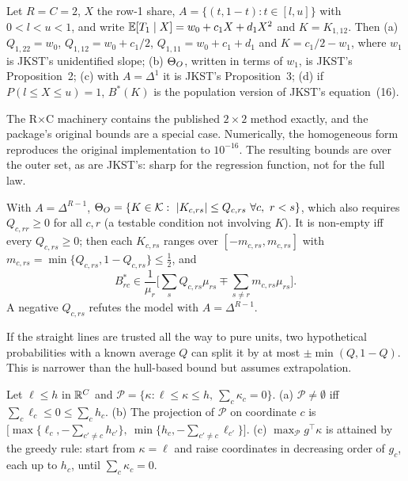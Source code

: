 \begin{proposition}\label{prop:jkst}
Let $R=C=2$, $X$ the row-1 share, $A=\{(t,1-t):t\in[l,u]\}$ with $0<l<u<1$, and
write $\mathbb E[T_1\mid X]=w_0+c_1X+d_1X^2$ and $K=K_{1,12}$. Then (a)
$Q_{1,22}=w_0$, $Q_{1,12}=w_0+c_1/2$, $Q_{1,11}=w_0+c_1+d_1$ and $K=c_1/2-w_1$,
where $w_1$ is JKST's unidentified slope; (b) $\Theta_O$, written in terms of $w_1$, is
JKST's Proposition~2; (c) with $A=\Delta^1$ it is JKST's Proposition~3; (d) if
$P(l\le X\le u)=1$, $B^*(K)$ is the population version of JKST's equation~(16).
\end{proposition}
\begin{reading}
The R$\times$C machinery contains the published $2\times2$ method exactly, and
the package's original bounds are a special case. Numerically, the homogeneous
form reproduces the original implementation to $10^{-16}$. The resulting bounds
are over the outer set, as are JKST's: sharp for the regression function, not for
the full law.
\end{reading}

\begin{proposition}\label{prop:simplex}
With $A=\Delta^{R-1}$, $\ThO=\{K\in\Kspace:\ |K_{c,rs}|\le Q_{c,rs}\ \forall c,\ r<s\}$,
which also requires $Q_{c,rr}\ge0$ for all $c,r$ (a testable condition not involving $K$).
It is non-empty iff every $Q_{c,rs}\ge0$; then each $K_{c,rs}$ ranges over
$[-m_{c,rs},m_{c,rs}]$ with $m_{c,rs}=\min\{Q_{c,rs},1-Q_{c,rs}\}\le\tfrac12$, and
\[
B^*_{rc}\in\frac1{\mu_r}\Big[\sum_sQ_{c,rs}\mu_{rs}\mp\sum_{s\ne r}m_{c,rs}\mu_{rs}\Big].
\]
A negative $Q_{c,rs}$ refutes the model with $A=\Delta^{R-1}$.
\end{proposition}
\begin{reading}
If the straight lines are trusted all the way to pure units, two hypothetical
probabilities with a known average $Q$ can split it by at most $\pm\min(Q,1-Q)$.
This is narrower than the hull-based bound but assumes extrapolation.
\end{reading}

\begin{lemma}\label{lem:box}
Let $\ell\le h$ in $\mathbb R^C$ and $\mathcal P=\{\kappa:\ell\le\kappa\le h,\ \sum_c\kappa_c=0\}$.
(a) $\mathcal P\neq\emptyset$ iff $\sum_c\ell_c\le0\le\sum_ch_c$.
(b) The projection of $\mathcal P$ on coordinate $c$ is
$\big[\max\{\ell_c,-\sum_{c'\ne c}h_{c'}\},\ \min\{h_c,-\sum_{c'\ne c}\ell_{c'}\}\big]$.
(c) $\max_{\mathcal P}g^\top\kappa$ is attained by the greedy rule: start from
$\kappa=\ell$ and raise coordinates in decreasing order of $g_c$, each up to
$h_c$, until $\sum_c\kappa_c=0$.
\end{lemma}

